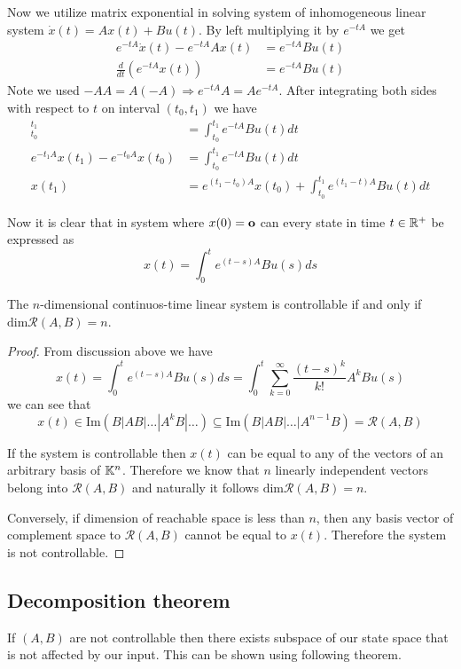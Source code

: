 Now we utilize matrix exponential in solving system of inhomogeneous linear system $\dot{x}(t)=Ax(t)+Bu(t)$. By left multiplying it by $e^{-tA}$ we get
\begin{align*}
	e^{-tA}\dot{x}(t)-e^{-tA}Ax(t) &=e^{-tA}Bu(t) \\
	\frac{d}{dt} (e^{-tA}x(t)) &=e^{-tA}Bu(t) 
\end{align*}
Note we used $-AA=A(-A)\Rightarrow e^{-tA}A=Ae^{-tA}$. After integrating both sides with respect to $t$ on interval $(t_0,t_1)$ we have 
\begin{align*}
	[e^{-tA}x(t)]^{t_1}_{t_0}&=\int^{t_1}_{t_0}e^{-tA}Bu(t)dt \\
	e^{-t_1A}x(t_1)-e^{-t_0A}x(t_0)&=\int^{t_1}_{t_0}e^{-tA}Bu(t)dt \\
	x(t_1)&=e^{(t_1-t_0)A}x(t_0)+\int^{t_1}_{t_0}e^{(t_1-t)A}Bu(t)dt
\end{align*}

Now it is clear that in system where $x(0)=\textbf{o}$ can every state in time $t\in \mathbb{R}^+$ be expressed as $$x(t)=\int^t_0 e^{(t-s)A}Bu(s)ds$$

\begin{theorem}
	The $n$-dimensional continuos-time linear system is controllable if and only if $\text{dim}\mathcal{R}(A,B)=n$.
\end{theorem}

\begin{proof}
	From discussion above we have $$x(t)=\int^t_0e^{(t-s)A}Bu(s)ds=\int^t_0\sum^\infty_{k=0}\frac{(t-s)^k}{k!}A^kBu(s)$$ we can see that $$x(t) \in \text{Im}(B|AB|\ldots|A^kB|\ldots)\subseteq \text{Im}(B|AB|\ldots|A^{n-1}B)=\mathcal{R}(A,B)$$ 
	
	If the system is controllable then $x(t)$ can be equal to any of the vectors of an arbitrary basis of $\mathbb{K}^n$. Therefore we know that $n$ linearly independent vectors belong into $\mathcal{R}(A,B)$ and naturally it follows $\text{dim}\mathcal{R}(A,B)=n$.

	Conversely, if dimension of reachable space is less than $n$, then any basis vector of complement space to $\mathcal{R}(A,B)$ cannot be equal to $x(t)$. Therefore the system is not controllable.
\end{proof}

\subsection{Decomposition theorem}

If $(A,B)$ are not controllable then there exists subspace of our state space that is not affected by our input. This can be shown using following theorem.

